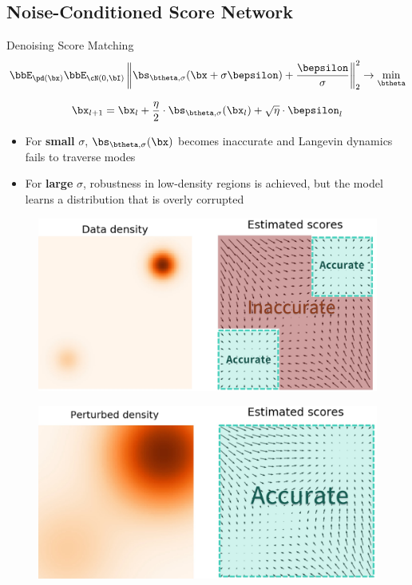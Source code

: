 \documentclass{beamer}
\begin{document}
\subsection{Noise-Conditioned Score Network}
\begin{frame}{Denoising Score Matching}
	\vspace{-0.5cm}
	\[
		\bbE_{\pd(\bx)} \bbE_{\cN(0, \bI)}\left\| \bs_{\btheta, \sigma}(\bx + \sigma \bepsilon) + \frac{\bepsilon}{\sigma} \right\|_2^2 \rightarrow \min_{\btheta}
	\]
	\begin{minipage}{0.5\linewidth}
		\[
			\bx_{l + 1} = \bx_l + \frac{\eta}{2} \cdot \bs_{\btheta, \sigma}(\bx_l) + \sqrt{\eta} \cdot \bepsilon_l
		\]
		\vspace{-0.3cm}
		\begin{itemize}
			\item For \textbf{small} $\sigma$, $\bs_{\btheta, \sigma}(\bx)$ becomes inaccurate and Langevin dynamics fails to traverse modes
			\item For \textbf{large} $\sigma$, robustness in low-density regions is achieved, but the model learns a distribution that is overly corrupted
		\end{itemize}
	\end{minipage}%
	\begin{minipage}{0.5\linewidth}
		\begin{figure}
			\includegraphics[width=\linewidth]{figs/pitfalls}
		\end{figure}
		\vspace{-0.3cm}
		\begin{figure}
			\includegraphics[width=\linewidth]{figs/single_noise}
		\end{figure}
	\end{minipage}
\end{frame}
\end{document}
